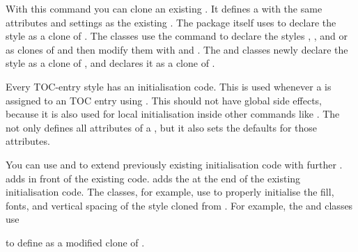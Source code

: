 \begin{Declaration}
\end{Declaration}
With this command you can clone
an existing . It defines a  with the same
attributes and settings as the existing . The package itself uses
 to declare the  style as a clone of
. The \KOMAScript{} classes use the command to declare
the styles , , and  or
 as clones of  and then modify them with
 and
. The  and
 classes newly declare the  style as a clone
of , and  declares it as a clone of
.%
\EndIndexGroup


\begin{Declaration}
\end{Declaration}
Every TOC-entry style has an
initialisation code. This is used whenever a  is assigned to an
TOC entry using . This
 should not have global side effects, because it is also
used for local initialisation inside other commands like
. The
 not only defines all attributes of a , but
it also sets the defaults for those attributes.

You can use  and
 to extend previously existing initialisation
code with further . 
adds  in front of the existing code.
 adds the  at the end of the
existing initialisation code. The \KOMAScript{} classes, for example, use
 to properly initialise the fill, fonts, and
vertical spacing of the  style cloned from . For
example, the  and  classes use
\begin{lstcode}
  \TOCEntryStyleStartInitCode{section}{%
    \expandafter\providecommand%
    \csname scr@tso@#1@linefill\endcsname
    {\TOCLineLeaderFill\relax}%
  }
\end{lstcode}
to define  as a modified clone of .%
\EndIndexGroup


